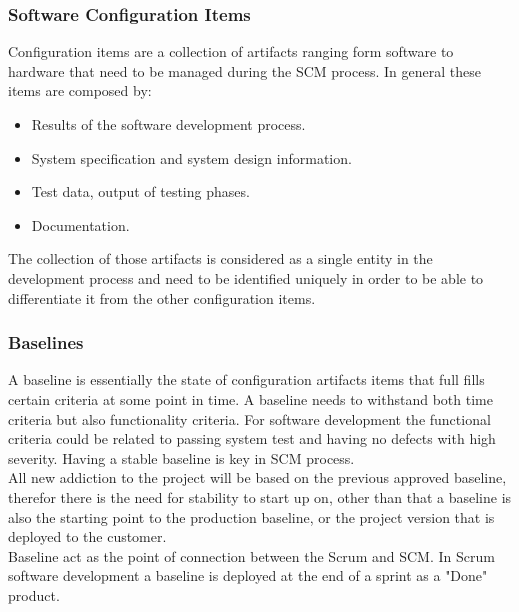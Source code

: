 \documentclass[../main.tex]{subfiles}
\begin{document}
\subsubsection{Software Configuration Items}
Configuration items are a collection of artifacts ranging form software to hardware that need to be managed during the \gls{SCM} process. In general these items are composed by:
\begin{itemize}
    \item Results of the software development process. 
    \item System specification and system design information.
    \item Test data, output of testing phases. 
    \item Documentation.
\end{itemize}
The collection of those artifacts is considered as a single entity in the development process and need to be identified uniquely in order to be able to differentiate it from the other configuration items. 
\subsubsection{Baselines}
A baseline is essentially the state of configuration artifacts items that full fills certain criteria at some point in time. A baseline needs to withstand both time criteria but also functionality criteria. For software development the functional criteria could be related to passing system test and having no defects with high severity. Having a stable baseline is key in \gls{SCM} process.\\
All new addiction to the project will be based on the previous approved baseline, therefor there is the need for stability to start up on, other than that a baseline is also the starting point to the production baseline, or the project version that is deployed to the customer.\\
Baseline act as the point of connection between the Scrum and \gls{SCM}. In Scrum software development a baseline is deployed at the end of a sprint as a "Done" product. 
\end{document}
